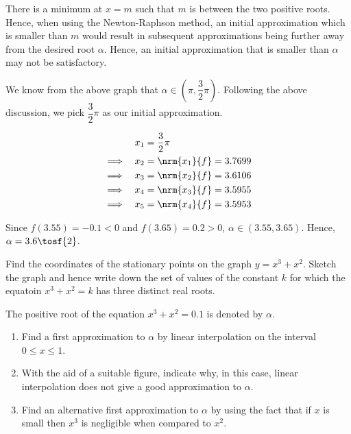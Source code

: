 \documentclass{jhwhw}
\begin{document}

        There is a minimum at $x=m$ such that $m$ is between the two positive roots. Hence, when using the Newton-Raphson method, an initial approximation which is smaller than $m$ would result in subsequent approximations being further away from the desired root $\alpha$. Hence, an initial approximation that is smaller than $\alpha$ may not be satisfactory.

        We know from the above graph that $\alpha \in (\pi, \dfrac32 \pi)$. Following the above discussion, we pick $\dfrac32 \pi$ as our initial approximation.

        \begin{alignat*}{2}
            && x_1 &= \dfrac32 \pi \\
            \implies&&x_2 &= \nrm{x_1}{f} = 3.7699\\
            \implies&&x_3 &= \nrm{x_2}{f} = 3.6106\\
            \implies&&x_4 &= \nrm{x_3}{f} = 3.5955\\
            \implies&&x_5 &= \nrm{x_4}{f} = 3.5953
        \end{alignat*}

        Since $f(3.55) = -0.1 < 0$ and $f(3.65) = 0.2 > 0$, $\alpha \in (3.55, 3.65)$. Hence, $\alpha = 3.6 \tosf{2}$.


    \problem{}
        Find the coordinates of the stationary points on the graph $y = x^3 + x^2$. Sketch the graph and hence write down the set of values of the constant $k$ for which the equatoin $x^3 + x^2 = k$ has three distinct real roots.

        The positive root of the equation $x^3 + x^2 = 0.1$ is denoted by $\alpha$.

        \begin{enumerate}
            \item Find a first approximation to $\alpha$ by linear interpolation on the interval $0 \leq x \leq 1$.
            \item With the aid of a suitable figure, indicate why, in this case, linear interpolation does not give a good approximation to $\alpha$.
            \item Find an alternative first approximation to $\alpha$ by using the fact that if $x$ is small then $x^3$ is negligible when compared to $x^2$.
        \end{enumerate}
\end{document}
